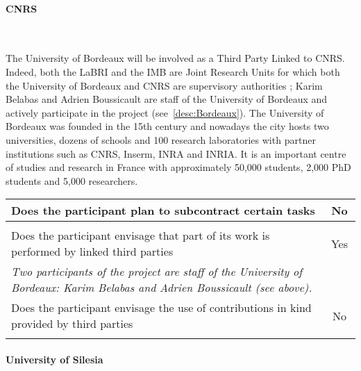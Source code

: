 \documentclass[noworkareas,deliverables,\classoptions]{euproposal}       %
\begin{document}
\begin{proposal}
\paragraph{CNRS}\ 


The University of Bordeaux will be involved as a Third Party Linked to CNRS.
Indeed, both the LaBRI and the IMB are Joint Research Units for which both the
University of Bordeaux and CNRS are supervisory authorities ; Karim Belabas and
Adrien Boussicault are staff of the University of Bordeaux and actively
participate in the project (see~\ref{desc:Bordeaux}).
The University of
Bordeaux was founded in the 15th century and nowadays the city hosts two
universities, dozens of schools and 100 research laboratories with partner
institutions such as CNRS, Inserm, INRA and INRIA. It is an important centre of
studies and research in France with approximately 50,000 students, 2,000 PhD
students and 5,000 researchers.

\smallskip

\bgroup
\def\arraystretch{1.5}  %
\noindent \begin{tabular}{|p{}|c|}
\hline
Does the participant plan to subcontract certain
tasks & No \\
\hline
\multicolumn{2}{|l|}{} \\
\hline
Does the participant envisage that part of its work
is performed by linked third parties & Yes \\
\hline
\multicolumn{2}{|l|}{\textit{Two participants of the project are staff of the University of Bordeaux: Karim Belabas and Adrien Boussicault (see above).}} \\
\hline
Does the participant envisage the use of
contributions in kind provided by
third parties & No \\
\hline
\multicolumn{2}{|l|}{} \\
\hline
\end{tabular}
\egroup

\bigskip

\paragraph{University of Silesia}\ 


\end{proposal}
\end{document}
